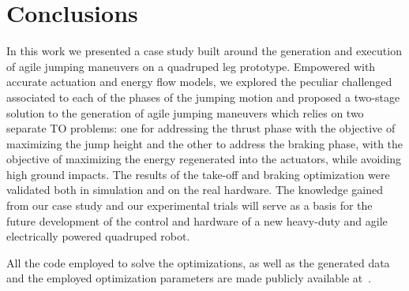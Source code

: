 \section{Conclusions}\label{sec:conclusions}
In this work we presented a case study built around the generation and execution of agile jumping maneuvers on a quadruped leg prototype.  
Empowered with accurate actuation and energy flow models, we explored the peculiar challenged associated to each of the phases of the jumping motion and proposed a two-stage solution to the generation of agile jumping maneuvers which relies on two separate TO problems: one for addressing the thrust phase with the objective of maximizing the jump height and the other to address the braking phase, with the objective of maximizing the energy regenerated into the actuators, while avoiding high ground impacts.
The results of the take-off and braking optimization were validated both in simulation and on the real hardware.
The knowledge gained from our case study and our experimental trials will serve as a basis for the future development of the control and hardware of a new heavy-duty and agile electrically powered quadruped robot. 

All the code employed to solve the optimizations, as well as the generated data and the employed optimization parameters are made publicly available at~\cite{url::awesome_leg_repo}.